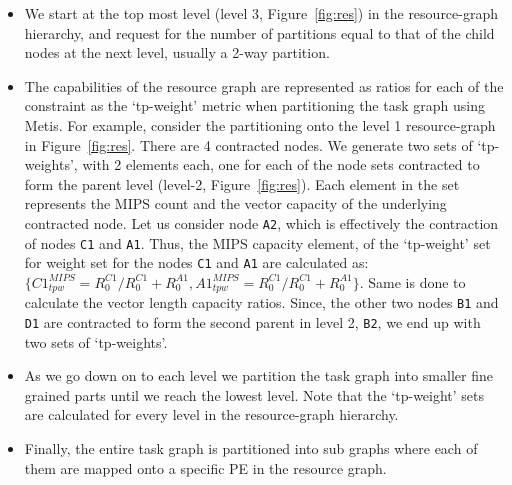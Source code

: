\begin{itemize}

\item We start at the top most level (level 3, Figure~\ref{fig:res}) in
  the resource-graph hierarchy, and request for the number of partitions
  equal to that of the child nodes at the next level, usually a 2-way
  partition.

\item The capabilities of the resource graph are represented as ratios
  for each of the constraint as the `tp-weight' metric when partitioning
  the task graph using Metis. For example, consider the partitioning
  onto the level 1 resource-graph in Figure~\ref{fig:res}. There are 4
  contracted nodes. We generate two sets of `tp-weights', with 2
  elements each, one for each of the node sets contracted to form the
  parent level (level-2, Figure~\ref{fig:res}). Each element in the set
  represents the MIPS count and the vector capacity of the underlying
  contracted node. Let us consider node \texttt{A2}, which is
  effectively the contraction of nodes \texttt{C1} and
  \texttt{A1}. Thus, the MIPS capacity element, of the `tp-weight' set
  for weight set for the nodes \texttt{C1} and \texttt{A1} are
  calculated as: {$\{C1^{MIPS}_{tpw} = R^{C1}_0/R^{C1}_0 + R^{A1}_0,
    A1^{MIPS}_{tpw} = R^{C1}_0/R^{C1}_0 + R^{A1}_0\}$}. Same is done to
  calculate the vector length capacity ratios. Since, the other two
  nodes \texttt{B1} and \texttt{D1} are contracted to form the second
  parent in level 2, \texttt{B2}, we end up with two sets of
  `tp-weights'.

\item As we go down on to each level we partition the task graph into
  smaller fine grained parts until we reach the lowest level. Note that
  the `tp-weight' sets are calculated for every level in the
  resource-graph hierarchy.

\item Finally, the entire task graph is partitioned into sub graphs
  where each of them are mapped onto a specific PE in the resource
  graph.

\end{itemize}




